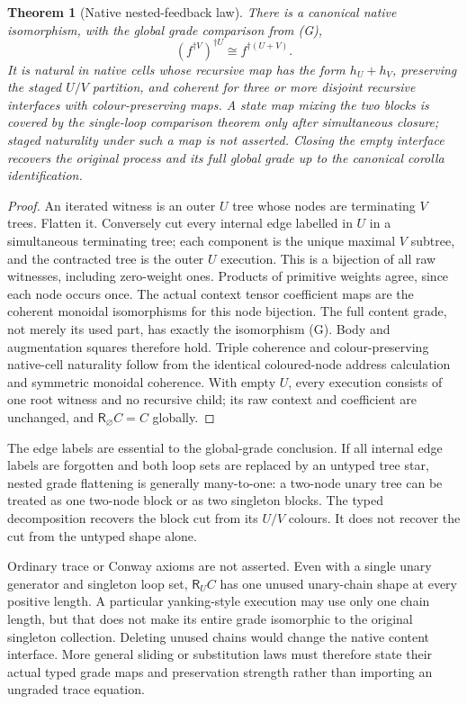 \documentclass[11pt]{article}
\newtheorem{theorem}{Theorem}\newtheorem{lemma}[theorem]{Lemma}\newtheorem{proposition}[theorem]{Proposition}
\newcommand{\R}{\mathsf R}\newcommand{\Col}{\mathsf{Col}}\newcommand{\Vect}{\mathbf{Vect}_k}
\begin{document}
\begin{theorem}[Native nested-feedback law]
There is a canonical native isomorphism, with the global grade comparison from (G),
\[
 (f^{\dagger V})^{\dagger U}\cong f^{\dagger(U+V)}.
\]
It is natural in native cells whose recursive map has the form $h_U+h_V$, preserving the staged $U/V$ partition, and coherent for three or more disjoint recursive interfaces with colour-preserving maps. A state map mixing the two blocks is covered by the single-loop comparison theorem only after simultaneous closure; staged naturality under such a map is not asserted. Closing the empty interface recovers the original process and its full global grade up to the canonical corolla identification.
\end{theorem}
\begin{proof}
An iterated witness is an outer $U$ tree whose nodes are terminating $V$ trees. Flatten it. Conversely cut every internal edge labelled in $U$ in a simultaneous terminating tree; each component is the unique maximal $V$ subtree, and the contracted tree is the outer $U$ execution. This is a bijection of all raw witnesses, including zero-weight ones. Products of primitive weights agree, since each node occurs once. The actual context tensor coefficient maps are the coherent monoidal isomorphisms for this node bijection. The full content grade, not merely its used part, has exactly the isomorphism (G). Body and augmentation squares therefore hold. Triple coherence and colour-preserving native-cell naturality follow from the identical coloured-node address calculation and symmetric monoidal coherence. With empty $U$, every execution consists of one root witness and no recursive child; its raw context and coefficient are unchanged, and $\R_\varnothing C=C$ globally.
\end{proof}

The edge labels are essential to the global-grade conclusion. If all internal edge labels are forgotten and both loop sets are replaced by an untyped tree star, nested grade flattening is generally many-to-one: a two-node unary tree can be treated as one two-node block or as two singleton blocks. The typed decomposition recovers the block cut from its $U/V$ colours. It does not recover the cut from the untyped shape alone.

Ordinary trace or Conway axioms are not asserted. Even with a single unary generator and singleton loop set, $\R_U C$ has one unused unary-chain shape at every positive length. A particular yanking-style execution may use only one chain length, but that does not make its entire grade isomorphic to the original singleton collection. Deleting unused chains would change the native content interface. More general sliding or substitution laws must therefore state their actual typed grade maps and preservation strength rather than importing an ungraded trace equation.
\end{document}
